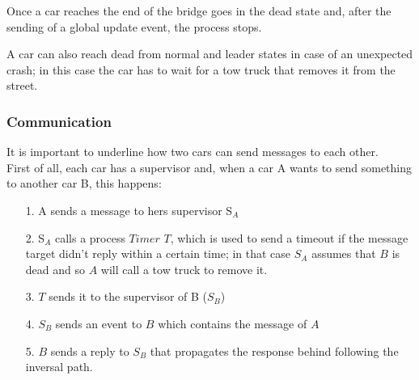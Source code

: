 Once a car reaches the end of the bridge goes in the dead state and, 
after the sending of a global update event, the process stops.

A car can also reach dead from normal and leader states in case of an unexpected 
crash; in this case the car has to wait for a tow truck that removes it from the 
street. 


\subsubsection{Communication}

It is important to underline how two cars can send messages to each other. \\
First of all, each car has a supervisor and, when a car A wants to send something to another car B,
this happens:
\begin{itemize}
   \item[1.] A sends a message to hers supervisor S$_{A}$
   \item [2.] S$_{A}$ calls a process $Timer$ $T$, which is used to send a timeout
   if the message target didn't reply within a certain time;
   in that case $S_{A}$ assumes that $B$ is dead and so $A$ will call 
   a tow truck to remove it.
   \item[3.] $T$ sends it to the supervisor of B ($S_{B}$)
   \item [4.] $S_{B}$ sends an event to $B$ which contains the message of $A$
   \item [5.] $B$ sends a reply to $S_{B}$ that propagates the response behind 
              following the inversal path. 
\end{itemize}



